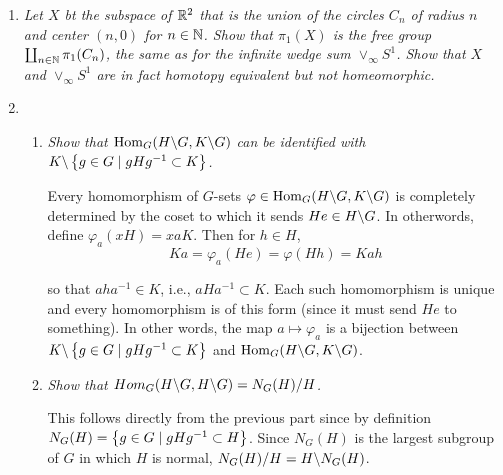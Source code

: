 \documentclass[10pt]{article}
\begin{document}
\begin{enumerate}
\item \emph{Let $X$ bt the subspace of $\mathbb{R}^2$ that is the union of the circles $C_n$ of radius $n$ and center $(n,0)$ for $n \in \mathbb{N}$.  Show that $\pi_1(X)$ is the free group $\coprod_{n \in \mathbb{N}} \pi_1(C_n)$, the same as for the infinite wedge sum $\vee_\infty S^1$.  Show that $X$ and $\vee_\infty S^1$ are in fact homotopy equivalent but not homeomorphic.}

\item
\begin{enumerate}
\item \emph{Show that $\operatorname{Hom}_G(H \backslash G,K \backslash G)$ can be identified with $K \backslash \left\{ g \in G \mid gHg^{-1} \subset K \right\}$.}

Every homomorphism of $G$-sets $\varphi \in \operatorname{Hom}_G(H \backslash G,K \backslash G)$ is completely determined by the coset to which it sends $He \in H \backslash G$.  In otherwords, define $\varphi_a(xH) = xaK$.  Then for $h \in H$, 
\[
Ka = \varphi_a(He) = \varphi(Hh) = Kah
\]

so that $aha^{-1} \in K$, i.e., $aHa^{-1} \subset K$.  Each such homomorphism is unique and every homomorphism is of this form (since it must send $He$ to something).  In other words, the map $a \mapsto \varphi_a$ is a bijection between $K \backslash \left\{ g \in G \mid gHg^{-1} \subset K \right\}$ and $\operatorname{Hom}_G(H \backslash G,K \backslash G)$.

\item \emph{Show that $Hom_G(H \backslash G,H \backslash G) = N_G(H) / H$.}

This follows directly from the previous part since by definition $N_G(H) = \left\{ g \in G \mid gHg^{-1} \subset H \right\}$.  Since $N_G(H)$ is the largest subgroup of $G$ in which $H$ is normal, $N_G(H) / H = H \backslash N_G(H)$.

\end{enumerate}
\end{enumerate}
\end{document}
